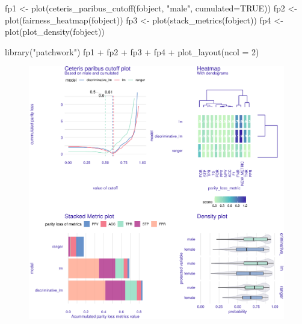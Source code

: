 \begin{example}
fp1  <- plot(ceteris_paribus_cutoff(fobject, "male", cumulated=TRUE))
fp2  <- plot(fairness_heatmap(fobject))
fp3  <- plot(stack_metrics(fobject))
fp4  <- plot(plot_density(fobject))
\end{example}

\begin{example}
library("patchwork")
fp1 + fp2 + fp3 + fp4 + 
  plot_layout(ncol = 2)
\end{example}
\begin{figure}

{\centering \includegraphics[width=1\linewidth]{Wisniewski-Biecek_files/figure-latex/all-1} 

}


\end{figure}
